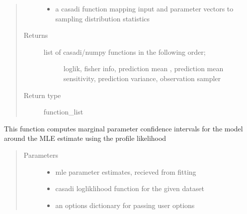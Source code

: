 \documentclass[letterpaper,10pt,english,openany,oneside]{sphinxmanual}
\begin{document}
\begin{fulllineitems}
\begin{fulllineitems}
\begin{quote}
\begin{description}
\begin{itemize}
\item {} 
 \textendash{} a casadi function mapping input and parameter vectors to sampling distribution statistics

\end{itemize}

\item[{Returns}] \leavevmode
\begin{description}
\item[{list of casadi/numpy functions in the following order;}] \leavevmode
loglik, fisher info, prediction mean , prediction mean sensitivity,
prediction variance, observation sampler

\end{description}


\item[{Return type}] \leavevmode
function\_list

\end{description}\end{quote}

\end{fulllineitems}


\begin{fulllineitems}
\label{\detokenize{nloed:nloed.model.Model.__confidence_intervals}}
This function computes marginal parameter confidence intervals for the model
around the MLE estimate using the profile likelihood
\begin{quote}\begin{description}
\item[{Parameters}] \leavevmode\begin{itemize}
\item {} 
 \textendash{} mle parameter estimates,  recieved from fitting

\item {} 
 \textendash{} casadi logliklihood function for the given dataset

\item {} 
 \textendash{} an options dictionary for passing user options


\end{itemize}
\end{description}
\end{quote}
\end{fulllineitems}
\end{fulllineitems}
\end{document}
